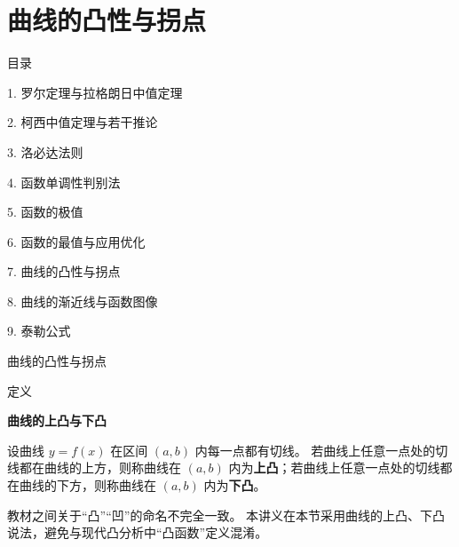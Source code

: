 \documentclass[aspectratio=169,10pt,fontset=fandol]{ctexbeamer}
\begin{document}
\section{曲线的凸性与拐点}
\begin{frame}[t,fragile]{目录}
\normalsize
{\color{black}\normalsize 1. 罗尔定理与拉格朗日中值定理\par}\vspace{0.22em}
{\color{black}\normalsize 2. 柯西中值定理与若干推论\par}\vspace{0.22em}
{\color{black}\normalsize 3. 洛必达法则\par}\vspace{0.22em}
{\color{black}\normalsize 4. 函数单调性判别法\par}\vspace{0.22em}
{\color{black}\normalsize 5. 函数的极值\par}\vspace{0.22em}
{\color{black}\normalsize 6. 函数的最值与应用优化\par}\vspace{0.22em}
{\color{blue}\normalsize 7. 曲线的凸性与拐点\par}\vspace{0.22em}
{\color{gray!40}\normalsize 8. 曲线的渐近线与函数图像\par}\vspace{0.22em}
{\color{gray!40}\normalsize 9. 泰勒公式\par}\vspace{0.22em}
\end{frame}
\begin{frame}[t,fragile]{曲线的凸性与拐点}
\normalsize
\begin{block}{定义}
{\normalsize
\textbf{曲线的上凸与下凸}\par

设曲线 $y=f(x)$ 在区间 $(a,b)$ 内每一点都有切线。 若曲线上任意一点处的切线都在曲线的上方，则称曲线在 $(a,b)$ 内为\textbf{上凸}；若曲线上任意一点处的切线都在曲线的下方，则称曲线在 $(a,b)$ 内为\textbf{下凸}。

教材之间关于“凸”“凹”的命名不完全一致。 本讲义在本节采用曲线的上凸、下凸说法，避免与现代凸分析中“凸函数”定义混淆。

}
\end{block}
\end{frame}
\end{document}
